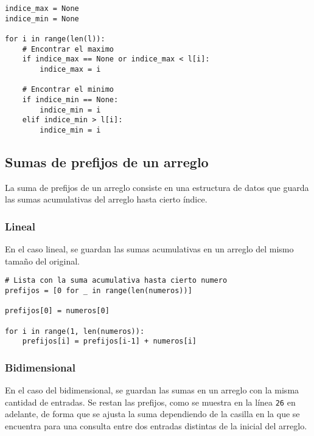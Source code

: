 \documentclass[12pt,letterpaper]{article}
\begin{document}
\begin{verbatim}
indice_max = None
indice_min = None

for i in range(len(l)):
    # Encontrar el maximo
    if indice_max == None or indice_max < l[i]:
        indice_max = i

    # Encontrar el minimo
    if indice_min == None:
        indice_min = i
    elif indice_min > l[i]:
        indice_min = i
\end{verbatim}

\subsection{Sumas de prefijos de un arreglo}

La suma de prefijos de un arreglo consiste en una estructura de datos que guarda las sumas acumulativas del arreglo hasta cierto índice.

\subsubsection{Lineal}

En el caso lineal, se guardan las sumas acumulativas en un arreglo del mismo tamaño del original.

\begin{verbatim}
# Lista con la suma acumulativa hasta cierto numero
prefijos = [0 for _ in range(len(numeros))]

prefijos[0] = numeros[0]

for i in range(1, len(numeros)):
    prefijos[i] = prefijos[i-1] + numeros[i]

\end{verbatim}

\subsubsection{Bidimensional}

En el caso del bidimensional, se guardan las sumas en un arreglo con la misma cantidad de entradas.
Se restan las prefijos, como se muestra en la línea \texttt{26} en adelante, de forma que se ajusta la suma dependiendo de la casilla en la que se encuentra para una consulta entre dos entradas distintas de la inicial del arreglo.
\end{document}
